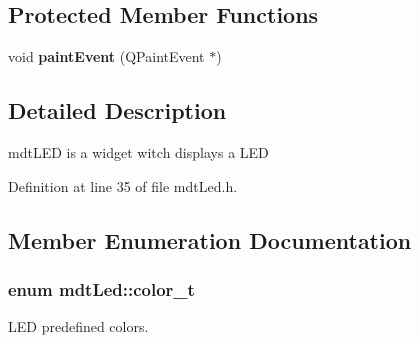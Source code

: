 \subsection*{Protected Member Functions}
\begin{DoxyCompactItemize}
\item 
\hypertarget{classmdt_led_a1c96c8e06658ba569f7cf6b3fc3f5903}{
void {\bfseries paintEvent} (QPaintEvent $\ast$)}
\label{classmdt_led_a1c96c8e06658ba569f7cf6b3fc3f5903}

\end{DoxyCompactItemize}


\subsection{Detailed Description}
mdtLED is a widget witch displays a LED 



Definition at line 35 of file mdtLed.h.



\subsection{Member Enumeration Documentation}
\hypertarget{classmdt_led_a2d57d9ef04d2105d2fad93b57fc7cfef}{
\subsubsection[{color\_\-t}]{\setlength{\rightskip}{0pt plus 5cm}enum {\bf mdtLed::color\_\-t}}}
\label{classmdt_led_a2d57d9ef04d2105d2fad93b57fc7cfef}


LED predefined colors. 

